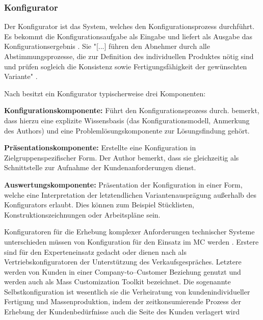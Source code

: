 \documentclass[12pt,a4paper,bibliography=totocnumbered,listof=totoc]{scrartcl}
\begin{document}
\subsubsection{Konfigurator}
Der Konfigurator ist das System, welches den Konfigurationsprozess durchführt. Es bekommt die Konfigurationsaufgabe als Eingabe und liefert als Ausgabe das Konfigurationsergebnis \citep{felferning14}. Sie "[...] führen den Abnehmer durch alle Abstimmungsprozesse, die zur Definition des individuellen Produktes nötig sind und prüfen sogleich die Konsistenz sowie Fertigungsfähigkeit der gewünschten Variante" \citep{piller06}.

Nach \citet{piller06} besitzt ein Konfigurator typischerweise drei Komponenten:
\begin{compactitem}
\item \textbf{Konfigurationskomponente:} Führt den Konfigurationsprozess durch. \citet{lutz11} bemerkt, dass hierzu eine explizite Wissensbasis (das Konfigurationsmodell, Anmerkung des Authors) und eine Problemlösungskomponente zur Lösungsfindung gehört.
\item \textbf{Präsentationskomponente:} Erstellte eine Konfiguration in Zielgruppenspezifischer Form. Der Author bemerkt, dass sie gleichzeitig als Schnittstelle zur Aufnahme der Kundenanforderungen dienst.
\item \textbf{Auswertungskomponente:} Präsentation der Konfiguration in einer Form, welche eine Interpretation der letztendlichen Variantenausprägung außerhalb des Konfigurators erlaubt. Dies können zum Beispiel Stücklisten, Konstruktionszeichnungen oder Arbeitspläne sein.
\end{compactitem}

Konfiguratoren für die Erhebung komplexer Anforderungen technischer Systeme unterschieden müssen von Konfiguration für den Einsatz im \ac{MC} werden \citep{felferning14}. Erstere sind für den Experteneinsatz gedacht oder dienen nach \citet{piller06} als Vertriebskonfiguratoren der Unterstützung des Verkaufsgespräches.   Letztere werden von Kunden in einer Company-to–Customer Beziehung genutzt und werden auch als Mass Customization Toolkit bezeichnet. Die sogenannte Selbstkonfiguration ist wesentlich sie die Verheiratung von kundenindividueller Fertigung und Massenproduktion, indem der zeitkonsumierende Prozess der Erhebung der Kundenbedürfnisse auch die Seite des Kunden verlagert wird\citep{piller06}
\end{document}
